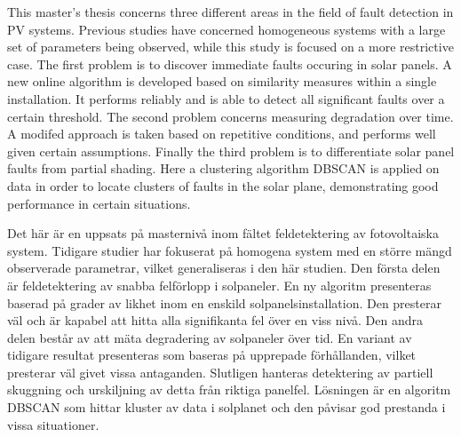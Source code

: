 \newenvironment{abstractpage}
  {\cleardoublepage\vspace*{\fill}\thispagestyle{empty}}
  {\vfill\cleardoublepage}
\newenvironment{polyAbstract}[1]
  {\bigskip\selectlanguage{#1}%
   \begin{center}\bfseries\abstractname\end{center}}
  {\par\bigskip}

\begin{abstractpage}
\begin{polyAbstract}{english}
This master's thesis concerns three different areas in the field of fault detection in PV systems.
Previous studies have concerned homogeneous systems with a large set of parameters being observed, while this study is focused on a more restrictive case.
The first problem is to discover immediate faults occuring in solar panels.
A new online algorithm is developed based on similarity measures within a single installation.
It performs reliably and is able to detect all significant faults over a certain threshold.
The second problem concerns measuring degradation over time.
A modifed approach is taken based on repetitive conditions, and performs well given certain assumptions.
Finally the third problem is to differentiate solar panel faults from partial shading.
Here a clustering algorithm DBSCAN is applied on data in order to locate clusters of faults in the solar plane, demonstrating good performance in certain situations.

\end{polyAbstract}

\begin{polyAbstract}{swedish}
Det här är en uppsats på masternivå inom fältet feldetektering av fotovoltaiska system.
Tidigare studier har fokuserat på homogena system med en större mängd observerade parametrar, vilket generaliseras i den här studien.
Den första delen är feldetektering av snabba felförlopp i solpaneler.
En ny algoritm presenteras baserad på grader av likhet inom en enskild solpanelsinstallation.
Den presterar väl och är kapabel att hitta alla signifikanta fel över en viss nivå.
Den andra delen består av att mäta degradering av solpaneler över tid.
En variant av tidigare resultat presenteras som baseras på upprepade förhållanden, vilket presterar väl givet vissa antaganden.
Slutligen hanteras detektering av partiell skuggning och urskiljning av detta från riktiga panelfel.
Lösningen är en algoritm DBSCAN som hittar kluster av data i solplanet och den påvisar god prestanda i vissa situationer.

\end{polyAbstract}
\end{abstractpage}

